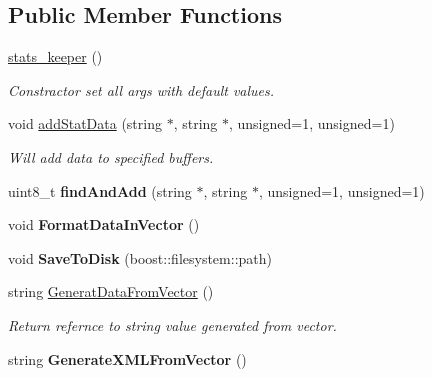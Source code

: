 \subsection*{Public Member Functions}
\begin{DoxyCompactItemize}
\item 
\hypertarget{classstats__keeper_aaae9b4375bd4436758125c29f3d90d8f}{
\hyperlink{classstats__keeper_aaae9b4375bd4436758125c29f3d90d8f}{stats\_\-keeper} ()}
\label{classstats__keeper_aaae9b4375bd4436758125c29f3d90d8f}

\begin{DoxyCompactList}\small\item\em Constractor set all args with default values. \item\end{DoxyCompactList}\item 
\hypertarget{classstats__keeper_aec5eb085aadb9eb2d29cc83f2d5072a7}{
void \hyperlink{classstats__keeper_aec5eb085aadb9eb2d29cc83f2d5072a7}{addStatData} (string $\ast$, string $\ast$, unsigned=1, unsigned=1)}
\label{classstats__keeper_aec5eb085aadb9eb2d29cc83f2d5072a7}

\begin{DoxyCompactList}\small\item\em Will add data to specified buffers. \item\end{DoxyCompactList}\item 
\hypertarget{classstats__keeper_addba17b8d0631948186c4425ba134f45}{
uint8\_\-t {\bfseries findAndAdd} (string $\ast$, string $\ast$, unsigned=1, unsigned=1)}
\label{classstats__keeper_addba17b8d0631948186c4425ba134f45}

\item 
\hypertarget{classstats__keeper_a6d4c92f9693d8b94401a5b9d053492f5}{
void {\bfseries FormatDataInVector} ()}
\label{classstats__keeper_a6d4c92f9693d8b94401a5b9d053492f5}

\item 
\hypertarget{classstats__keeper_a79240fdca0d52f74334757317367aa0c}{
void {\bfseries SaveToDisk} (boost::filesystem::path)}
\label{classstats__keeper_a79240fdca0d52f74334757317367aa0c}

\item 
\hypertarget{classstats__keeper_ab10c9697298961d0411df74d6759b63f}{
string \hyperlink{classstats__keeper_ab10c9697298961d0411df74d6759b63f}{GeneratDataFromVector} ()}
\label{classstats__keeper_ab10c9697298961d0411df74d6759b63f}

\begin{DoxyCompactList}\small\item\em Return refernce to string value generated from vector. \item\end{DoxyCompactList}\item 
\hypertarget{classstats__keeper_a49832367fed98f0e646b7f0bfe74d876}{
string {\bfseries GenerateXMLFromVector} ()}
\label{classstats__keeper_a49832367fed98f0e646b7f0bfe74d876}

\end{DoxyCompactItemize}
